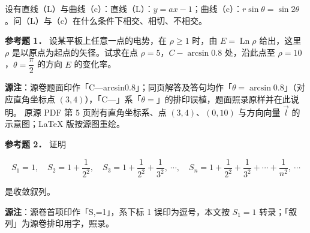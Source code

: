\begin{question}
设有直线（L）与曲线（c）：直线（L）：$y=ax-1$；曲线（c）：$r\sin\theta=\sin2\theta$。问（L）与（c）在什么条件下相交、相切、不相交。

\textbf{参考题 1．} 设某平板上任意一点的电势，在 $\rho\geqslant1$ 时，由 $E=\operatorname{Ln}\rho$ 给出，这里 $\rho$ 是以原点为起点的矢径。试求在点 $\rho=5$，$C-\arcsin 0.8$ 处，沿此点至 $\rho=10$，$\theta=\dfrac{\pi}{2}$ 的方向 $E$ 的变化率。

\begin{gktip}
\textbf{源注}：源卷题面印作「C—arcsin0.8」；同页解答及答句均作「$\theta=\arcsin 0.8$」（对应直角坐标点 $(3,4)$），「C—」系「$\theta=$」的排印误植，题面照录原样并在此说明。
原源 PDF 第 5 页附有直角坐标系、点 $(3,4)$、$(0,10)$ 与方向向量 $\vec{l}$ 的示意图；LaTeX 版按源图重绘。
\end{gktip}
\nopagebreak[4]
\begin{center}\end{center}
\nopagebreak[4]
\textbf{参考题 2．} 证明

\nopagebreak[4]
\[
S_{1}=1,\quad S_{2}=1+\frac{1}{2^{2}},\quad S_{3}=1+\frac{1}{2^{2}}+\frac{1}{3^{2}},\ \cdots,\quad S_{n}=1+\frac{1}{2^{2}}+\frac{1}{3^{2}}+\cdots+\frac{1}{n^{2}},\ \cdots
\]

是收敛叙列。

\begin{gktip}
\textbf{源注}：源卷首项印作「S,=1」，系下标 1 误印为逗号，本文按 $S_{1}=1$ 转录；「叙列」为源卷排印用字，照录。
\end{gktip}

\end{question}